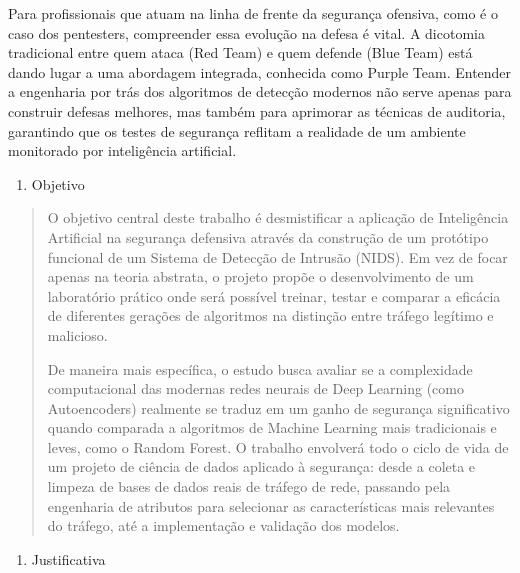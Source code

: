 \documentclass[]{article}
\begin{document}
Para profissionais que atuam na linha de frente da segurança ofensiva,
como é o caso dos pentesters, compreender essa evolução na defesa é
vital. A dicotomia tradicional entre quem ataca (Red Team) e quem
defende (Blue Team) está dando lugar a uma abordagem integrada,
conhecida como Purple Team. Entender a engenharia por trás dos
algoritmos de detecção modernos não serve apenas para construir defesas
melhores, mas também para aprimorar as técnicas de auditoria, garantindo
que os testes de segurança reflitam a realidade de um ambiente
monitorado por inteligência artificial.

\begin{enumerate}
\def\labelenumi{\arabic{enumi}.}
\item
  Objetivo
\end{enumerate}

\begin{quote}
O objetivo central deste trabalho é desmistificar a aplicação de
Inteligência Artificial na segurança defensiva através da construção de
um protótipo funcional de um Sistema de Detecção de Intrusão (NIDS). Em
vez de focar apenas na teoria abstrata, o projeto propõe o
desenvolvimento de um laboratório prático onde será possível treinar,
testar e comparar a eficácia de diferentes gerações de algoritmos na
distinção entre tráfego legítimo e malicioso.

De maneira mais específica, o estudo busca avaliar se a complexidade
computacional das modernas redes neurais de Deep Learning (como
Autoencoders) realmente se traduz em um ganho de segurança significativo
quando comparada a algoritmos de Machine Learning mais tradicionais e
leves, como o Random Forest. O trabalho envolverá todo o ciclo de vida
de um projeto de ciência de dados aplicado à segurança: desde a coleta e
limpeza de bases de dados reais de tráfego de rede, passando pela
engenharia de atributos para selecionar as características mais
relevantes do tráfego, até a implementação e validação dos modelos.
\end{quote}

\begin{enumerate}
\def\labelenumi{\arabic{enumi}.}
\setcounter{enumi}{1}
\item
  Justificativa
\end{enumerate}
\end{document}

